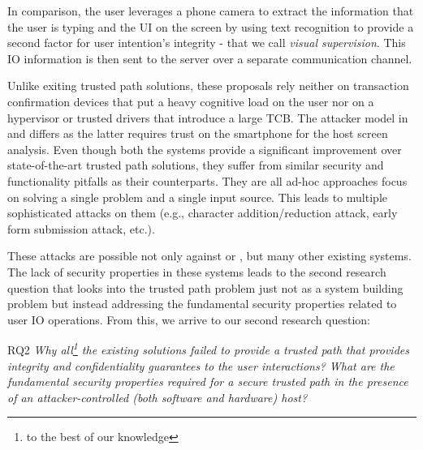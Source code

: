 In comparison, \integriscreen the user leverages a phone camera to extract the information that the user is typing and the UI on the screen by using text recognition to provide a second factor for user intention's integrity - that we call \emph{visual supervision}. This IO information is then sent to the server over a separate communication channel. 

Unlike exiting trusted path solutions, these proposals rely neither on transaction confirmation devices that put a heavy cognitive load on the user nor on a hypervisor or trusted drivers that introduce a large TCB. The attacker model in \integrikey and \integriscreen differs as the latter requires trust on the smartphone for the host screen analysis. Even though both the systems provide a significant improvement over state-of-the-art trusted path solutions, they suffer from similar security and functionality pitfalls as their counterparts. They are all ad-hoc approaches focus on solving a single problem and a single input source. This leads to multiple sophisticated attacks on them (e.g., character addition/reduction attack, early form submission attack, etc.). 

These attacks are possible not only against \integrikey or \integriscreen, but many other existing systems. The lack of security properties in these systems leads to the second research question that looks into the trusted path problem just not as a system building problem but instead addressing the fundamental security properties related to user IO operations. From this, we arrive to our second research question:

\begin{mybox}[colback=white]{RQ2}
\emph{Why all\footnote{to the best of our knowledge} the existing solutions failed to provide a trusted path that provides integrity and confidentiality guarantees to the user interactions? What are the fundamental security properties required for a secure trusted path in the presence of an attacker-controlled (both software and hardware) host?}
\end{mybox}

 
    
